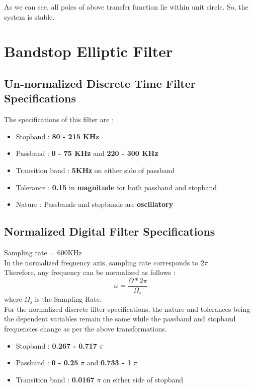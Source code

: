 \documentclass{article}
\begin{document}
As we can see, all poles of above transfer function lie within unit circle. So, the system is stable.
\newpage
\section{\textbf{Bandstop Elliptic Filter}}
\subsection{\textbf{Un-normalized Discrete Time Filter Specifications}}

\vspace{1.5em}
\noindent
The specifications of this filter are :
\begin{itemize}
    \item Stopband : \textbf{80 - 215 KHz}
    \item Passband : \textbf{0 - 75 KHz} and \textbf{220 - 300 KHz}
    \item  Transition band : \textbf{5KHz} on either side of passband
    \item  Tolerance : \textbf{0.15} in \textbf{magnitude} for both passband and stopband
    \item  Nature : Passbands and stopbands are \textbf{oscillatory} 
\end{itemize}


\subsection{Normalized Digital Filter Specifications}
Sampling rate = 600KHz\\
In the normalized frequency axis, sampling rate corresponds to 2$\pi$\\

Therefore, any frequency can be normalized as follows :
\begin{equation*}
    \omega = \frac{\Omega*2\pi}{\Omega_s}
\end{equation*}
where $\Omega_s$ is the Sampling Rate.\\

\vspace{1em}
\noindent
For the normalized discrete filter specifications, the nature and tolerances being the dependent variables remain the same while the passband and stopband frequencies change as per the above transformations. 
\begin{itemize}
    \item Stopband : \textbf{0.267 - 0.717} {$\pi$}
    \item Passband : \textbf{0 -  0.25} {$\pi$} and \textbf{0.733 - 1} {$\pi$}
    \item  Transition band : \textbf{0.0167} $\pi$ on either side of stopband
\end{itemize}
\end{document}
